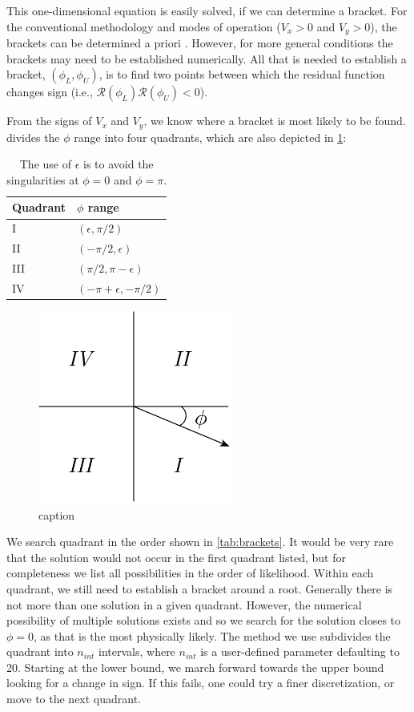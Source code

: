 \documentclass{article}
\begin{document}
This one-dimensional equation is easily solved, if we can determine a bracket.  For the conventional methodology and modes of operation ($V_x > 0$ and $V_y > 0$), the brackets can be determined a priori \cite{Ning2014-Simple-Solution}.  However, for more general conditions the brackets may need to be established numerically.  All that is needed to establish a bracket, $(\phi_L, \phi_U)$, is to find two points between which the residual function changes sign (i.e., $\mathcal{R}(\phi_L)\mathcal{R}(\phi_U) < 0$).

From the signs of $V_x$ and $V_y$, we know where a bracket is most likely to be found.   divides the $\phi$ range into four quadrants, which are also depicted in \cref{fig:quadrants}:
\begin{table}[htb]
\centering
\caption{The use of $\epsilon$ is to avoid the singularities at $\phi = 0$ and $\phi = \pi$.}
\label{tab:quadrants}
\begin{tabular}{@{}ll@{}}
\toprule
Quadrant & $\phi$ range\\
\midrule
I & $(\epsilon, \pi/2)$ \\
II & $(-\pi/2, \epsilon)$ \\
III & $(\pi/2, \pi-\epsilon)$ \\
IV & $(-\pi+\epsilon, -\pi/2)$ \\
\bottomrule
\end{tabular}
\end{table}
\begin{figure}[htbp]
\centering
\includegraphics[width=2.5in]{figures/quadrants}
\caption{caption}
\label{fig:quadrants}
\end{figure}

We search quadrant in the order shown in \cref{tab:brackets}.  It would be very rare that the solution would not occur in the first quadrant listed, but for completeness we list all possibilities in the order of likelihood.  Within each quadrant, we still need to establish a bracket around a root.  Generally there is not more than one solution in a given quadrant.  However, the numerical possibility of multiple solutions exists and so we search for the solution closes to $\phi = 0$, as that is the most physically likely.  The method we use subdivides the quadrant into $n_{int}$ intervals, where $n_{int}$ is a user-defined parameter defaulting to 20.  Starting at the lower bound, we march forward towards the upper bound looking for a change in sign.  If this fails, one could try a finer discretization, or move to the next quadrant.
\end{document}
